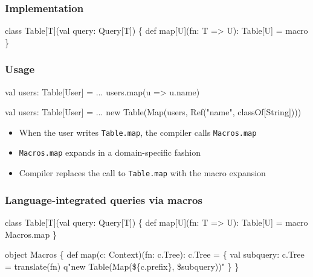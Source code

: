 \documentclass[svgnames,dvipsnames,hyperref={bookmarks=false},usepdftitle=false]{beamer}
\begin{document}
\begin{frame}[fragile, t]
\frametitle{Implementation}

\begin{semiverbatim}
class Table[T](val query: Query[T]) \{
  \alert<1>{def map[U](fn: T => U): Table[U] = \alert<2>{macro }\alert<2>{}}
\}


\end{semiverbatim}

\begin{itemize}
\end{itemize}
\end{frame}

\begin{frame}[fragile]
\frametitle{Usage}

\begin{semiverbatim}
val users: Table[User] = ...
\alert{users.map(u => u.name)}

                          \arrowdown

val users: Table[User] = ...
\alert{new Table(Map(users, Ref("name", classOf[String])))}

\end{semiverbatim}

\begin{itemize}
\item When the user writes \texttt{Table.map}, the compiler calls \texttt{Macros.map}
\item \texttt{Macros.map} expands in a domain-specific fashion
\item Compiler replaces the call to \texttt{Table.map} with the macro expansion
\end{itemize}
\end{frame}

\begin{frame}[fragile]
\frametitle{Language-integrated queries via macros}
\begin{semiverbatim}
class Table[T](val query: Query[T]) \{
  def map[U](fn: T => U): Table[U] = macro Macros.map
\}

object Macros \{
  def map(c: Context)(fn: c.Tree): c.Tree = \{
    val subquery: c.Tree = translate(fn)
    q"new Table(Map(\$\{c.prefix\}, \$subquery))"
  \}
\}
\end{semiverbatim}
\end{frame}
\end{document}
